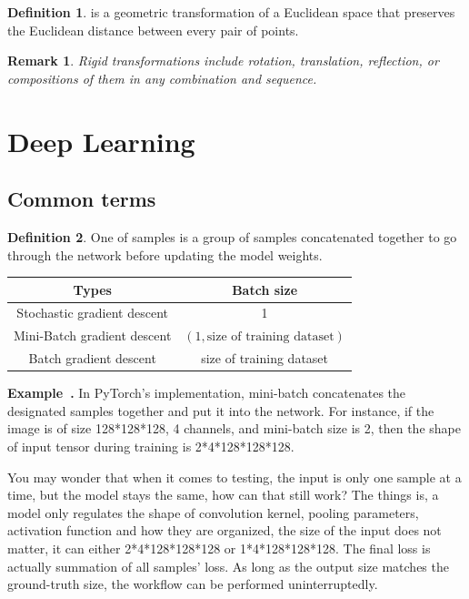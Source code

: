 \documentclass[a4paper]{article}
\theoremstyle{definition}
\newtheorem{definition}{Definition}
\theoremstyle{plain}
\newtheorem{remark}{Remark}
\newenvironment{example}[1][]{\refstepcounter{example}\par\medskip
   \noindent \textbf{Example~\theexample. #1} \rmfamily}{\medskip}
\newcounter{example}{Example}
\begin{document}
\begin{definition}
 is a geometric transformation of a Euclidean space that preserves the Euclidean distance between every pair of points.
\end{definition}

\begin{remark}
Rigid transformations include rotation, translation, reflection, or compositions of them in any combination and sequence.
\end{remark}

\newpage
\section{Deep Learning}
\subsection{Common terms}
\begin{definition}
One  of samples is a group of samples concatenated together to go through the network before updating the model weights.
\end{definition}

\begin{table}[H]
\centering
\begin{tabular}{cc}
\hline
{ \textbf{Types}}              & { \textbf{Batch size}}                    \\ \hline
Stochastic gradient descent & 1 \\
Mini-Batch gradient descent & $(1, \text{size of training dataset})$\\
Batch gradient descent      & size of training dataset \\ \hline
\end{tabular}
\end{table}

\begin{example}
In PyTorch's implementation, mini-batch concatenates the designated samples together and put it into the network. For instance, if the image is of size 128*128*128, 4 channels, and mini-batch size is 2, then the shape of input tensor during training is 2*4*128*128*128. 

You may wonder that when it comes to testing, the input is only one sample at a time, but the model stays the same, how can that still work? The things is, a model only regulates the shape of convolution kernel, pooling parameters, activation function and how they are organized, the size of the input does not matter, it can either 2*4*128*128*128 or 1*4*128*128*128. The final loss is actually summation of all samples' loss. As long as the output size matches the ground-truth size, the workflow can be performed uninterruptedly.
\end{example}
\end{document}
